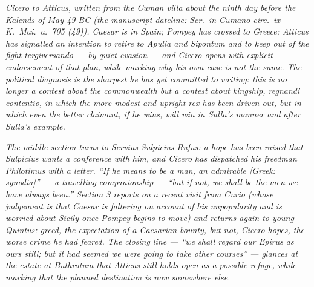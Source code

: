 
\textit{Cicero to Atticus, written from the Cuman villa
about the ninth day before the Kalends of May 49 BC
(the manuscript dateline: \textit{Scr.\ in Cumano circ.\
ix K.\ Mai.\ a.\ 705 (49)}). Caesar is in Spain; Pompey
has crossed to Greece; Atticus has signalled an
intention to retire to Apulia and Sipontum and to keep
out of the fight \textit{tergiversando} --- by quiet
evasion --- and Cicero opens with explicit endorsement
of that plan, while marking why his own case is not the
same. The political diagnosis is the sharpest he has
yet committed to writing: this is no longer a contest
about the commonwealth but a contest about kingship,
\textit{regnandi contentio}, in which the more modest
and upright \textit{rex} has been driven out, but in
which even the better claimant, if he wins, will win in
Sulla's manner and after Sulla's example.}

\textit{The middle section turns to Servius Sulpicius
Rufus: a hope has been raised that Sulpicius wants a
conference with him, and Cicero has dispatched his
freedman Philotimus with a letter. ``If he means to be
a man, an admirable \textit{[Greek: synodia]}'' --- a
travelling-companionship --- ``but if not, we shall be
the men we have always been.'' Section 3 reports on a
recent visit from Curio (whose judgement is that Caesar
is faltering on account of his unpopularity and is
worried about Sicily once Pompey begins to move) and
returns again to young Quintus: greed, the expectation
of a Caesarian bounty, but not, Cicero hopes, the
worse crime he had feared. The closing line --- ``we
shall regard our Epirus as ours still; but it had
seemed we were going to take other courses'' ---
glances at the estate at Buthrotum that Atticus still
holds open as a possible refuge, while marking that
the planned destination is now somewhere else.}
